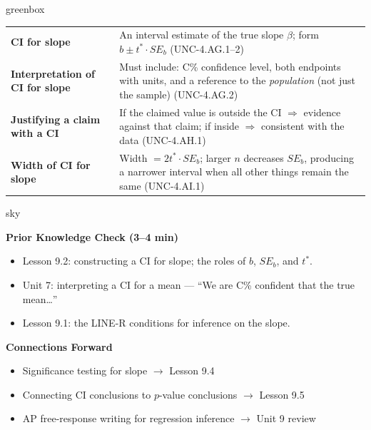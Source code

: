 \documentclass[10pt]{article}
\begin{document}
\begin{skillbox}{greenbox}
\renewcommand{\arraystretch}{1.3}
\begin{tabularx}{\linewidth}{lX}
    \textbf{CI for slope} &
        An interval estimate of the true slope $\beta$; form $b \pm t^* \cdot SE_b$
        (UNC-4.AG.1--2) \\
    \textbf{Interpretation of CI for slope} &
        Must include: C\% confidence level, both endpoints with units, and a reference to the
        \emph{population} (not just the sample) (UNC-4.AG.2) \\
    \textbf{Justifying a claim with a CI} &
        If the claimed value is outside the CI $\Rightarrow$ evidence against that claim;
        if inside $\Rightarrow$ consistent with the data (UNC-4.AH.1) \\
    \textbf{Width of CI for slope} &
        Width $= 2t^* \cdot SE_b$; larger $n$ decreases $SE_b$, producing a narrower interval
        when all other things remain the same (UNC-4.AI.1) \\
\end{tabularx}
\end{skillbox}

\begin{skillbox}{sky}
\begin{minipage}[t]{0.48\linewidth}
    \textbf{Prior Knowledge Check (3--4 min)}
    \begin{itemize}
        \item Lesson 9.2: constructing a CI for slope; the roles of $b$, $SE_b$, and $t^*$.
        \item Unit 7: interpreting a CI for a mean --- ``We are C\% confident that the true
              mean\ldots''
        \item Lesson 9.1: the LINE-R conditions for inference on the slope.
    \end{itemize}
\end{minipage}
\hfill
\begin{minipage}[t]{0.48\linewidth}
    \textbf{Connections Forward}
    \begin{itemize}
        \item Significance testing for slope $\to$ Lesson 9.4
        \item Connecting CI conclusions to $p$-value conclusions $\to$ Lesson 9.5
        \item AP free-response writing for regression inference $\to$ Unit 9 review
    \end{itemize}
\end{minipage}
\end{skillbox}
\end{document}
